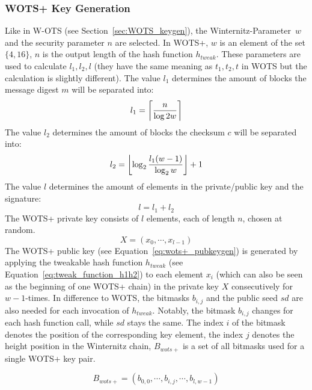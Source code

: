 \subsubsection{WOTS+ Key Generation}
\label{sec:wots+_keygen}
Like in W-OTS (see Section~\ref{sec:WOTS_keygen}), the Winternitz-Parameter~$w$ and the security parameter $n$ are selected. In WOTS+, $w$ is an element of the set $\{4, 16\}$, $n$ is the output length of the hash function $h_{tweak}$.
These parameters are used to calculate $l_1, l_2, l$ (they have the same meaning as $t_1, t_2, t$ in WOTS but the calculation is slightly different).
The value $l_1$ determines the amount of blocks the message digest $m$ will be separated into:
\begin{equation}
l_1 = \ceil*{\frac{n}{\log{2}w}}
\end{equation}
The value $l_2$ determines the amount of blocks the checksum $c$ will be separated into: 
\begin{equation}
l_2 = \floor*{\log_{2} \frac{l_1 (w-1)}{\log_{2}w} } +1
\end{equation}
The value $l$ determines the amount of elements in the private/public key and the signature:
\begin{equation}
l = l_1 + l_2
\end{equation}
The WOTS+ private key consists of $l$ elements, each of length $n$, chosen at random.
\begin{equation}
\label{eq:wots+_privkey}
X = (x_0, \cdots, x_{l-1})
\end{equation}
The WOTS+ public key (see Equation~\ref{eq:wots+_pubkeygen}) is generated by applying the tweakable hash function $h_{tweak}$ (see Equation~\ref{eq:tweak_function_h1h2}) to each element $x_i$ (which can also be seen as the beginning of one WOTS+ chain) in the private key $X$ consecutively for $w-1$-times. In difference to WOTS, the bitmasks $b_{i,j}$ and the public seed $sd$ are also needed for each invocation of $h_{tweak}$. Notably, the bitmask $b_{i,j}$ changes for each hash function call, while $sd$ stays the same. The index $i$ of the bitmask denotes the position of the corresponding key element, the index $j$ denotes the height position in the Winternitz chain, $B_{wots+}$ is a set of all bitmasks used for a single WOTS+ key pair.

\begin{equation}
\label{eq:wots+_all_bitmasks}
B_{wots+} = (b_{0,0}, \cdots, b_{i,j}, \cdots, b_{l,w-1})
\end{equation}

